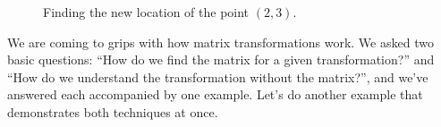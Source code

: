 \begin{figure}[h!]
\begin{center}
\end{center}
\caption{Finding the new location of the point $(2,3)$.}
\label{fig:trans2}
\end{figure}

We are coming to grips with how matrix transformations work. We asked two basic questions: ``How do we find the matrix for a given transformation?'' and ``How do we understand the transformation without the matrix?'', and we've answered each accompanied by one example. Let's do another example that demonstrates both techniques at once.\\

